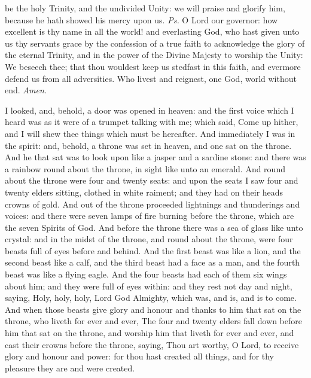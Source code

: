
\introit
{} be the holy Trinity, and the undivided Unity: we will praise and glorify him, because he hath showed his mercy upon us. \textit{Ps.} O Lord our governor: how excellent is thy name in all the world!
\collect
{} and everlasting God, who hast given unto us thy servants grace by the confession of a true faith to acknowledge the glory of the eternal Trinity, and in the power of the Divine Majesty to worship the Unity: We beseech thee; that thou wouldest keep us stedfast in this faith, and evermore defend us from all adversities. Who livest and reignest, one God, world without end. \textit{Amen.}

 I looked, and, behold, a door was opened in heaven: and the first voice which I heard was as it were of a trumpet talking with me; which said, Come up hither, and I will shew thee things which must be hereafter. And immediately I was in the spirit: and, behold, a throne was set in heaven, and one sat on the throne. And he that sat was to look upon like a jasper and a sardine stone: and there was a rainbow round about the throne, in sight like unto an emerald. And round about the throne were four and twenty seats: and upon the seats I saw four and twenty elders sitting, clothed in white raiment; and they had on their heads crowns of gold. And out of the throne proceeded lightnings and thunderings and voices: and there were seven lamps of fire burning before the throne, which are the seven Spirits of God. And before the throne there was a sea of glass like unto crystal: and in the midst of the throne, and round about the throne, were four beasts full of eyes before and behind. And the first beast was like a lion, and the second beast like a calf, and the third beast had a face as a man, and the fourth beast was like a flying eagle. And the four beasts had each of them six wings about him; and they were full of eyes within: and they rest not day and night, saying, Holy, holy, holy, Lord God Almighty, which was, and is, and is to come. And when those beasts give glory and honour and thanks to him that sat on the throne, who liveth for ever and ever, The four and twenty elders fall down before him that sat on the throne, and worship him that liveth for ever and ever, and cast their crowns before the throne, saying, Thou art worthy, O Lord, to receive glory and honour and power: for thou hast created all things, and for thy pleasure they are and were created.

